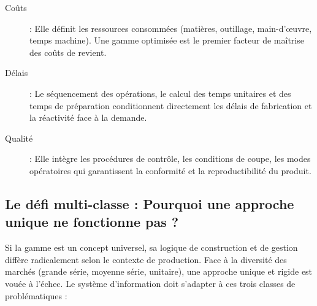 \documentclass{article}
\begin{document}
\begin{tcolorbox}[colback=blue!5!white, colframe=blue!75!black, title=Impact de la gamme]
\begin{description}
    \item[Coûts] : Elle définit les ressources consommées (matières, outillage, main-d'œuvre, temps machine). Une gamme optimisée est le premier facteur de maîtrise des coûts de revient.
    \item[Délais] : Le séquencement des opérations, le calcul des temps unitaires et des temps de préparation conditionnent directement les délais de fabrication et la réactivité face à la demande.
    \item[Qualité] : Elle intègre les procédures de contrôle, les conditions de coupe, les modes opératoires qui garantissent la conformité et la reproductibilité du produit.
\end{description}
\end{tcolorbox}

\subsection*{Le défi multi-classe : Pourquoi une approche unique ne fonctionne pas ?}

Si la gamme est un concept universel, sa logique de construction et de gestion diffère radicalement selon le contexte de production. Face à la diversité des marchés (grande série, moyenne série, unitaire), une approche unique et rigide est vouée à l'échec. Le système d'information doit s'adapter à ces trois classes de problématiques :
\end{document}
